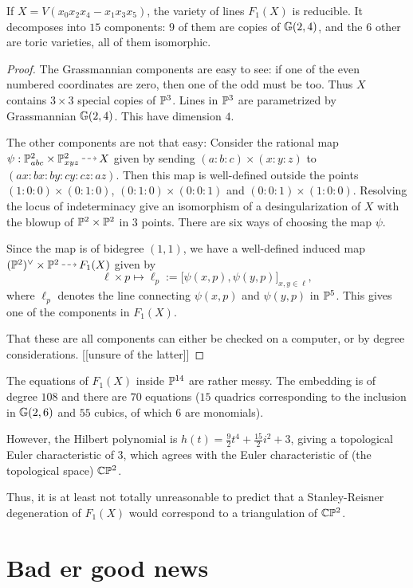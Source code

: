 \documentclass[11pt, english]{article}
\begin{document}
\begin{prop}
If $X=V(x_0x_2x_4-x_1x_3x_5)$, the variety of lines $F_1(X)$ is reducible. It decomposes into $15$ components: $9$ of them are copies of $\mathbb{G}(2,4)$, and the $6$ other are toric varieties, all of them isomorphic.
\end{prop}
\begin{proof}
The Grassmannian components are easy to see: if one of the even numbered coordinates are zero, then one of the odd must be too. Thus $X$ contains $3 \times 3$ special copies of $\mathbb{P}^3$. Lines in $\mathbb{P}^3$ are parametrized by Grassmannian $\mathbb{G}(2,4)$. This have dimension $4$. 

The other components are not that easy: Consider the  rational map $\psi:\PP^2_{abc} \times \PP^2_{xyz} \rmap X$ given by sending $(a:b:c) \times (x:y:z)$ to $(ax:bx:by:cy:cz:az)$. Then this map is well-defined outside the points $(1:0:0) \times (0:1:0)$, $(0:1:0)\times (0:0:1)$ and $(0:0:1)\times(1:0:0)$. Resolving the locus of indeterminacy give an isomorphism of a desingularization of $X$ with the blowup of $\mathbb{P}^2 \times \mathbb{P}^2$ in $3$ points. There are six ways of choosing the map $\psi$.

Since the map is of bidegree $(1,1)$, we have a well-defined induced map $(\PP^2)^\vee \times \PP^2 \rmap F_1(X)$ given by
\[
\ell \times p \mapsto \ell_p := \big[\psi(x,p),\psi(y,p)\big]_{x,y \in \ell},
\]
where $\ell_p$ denotes the line connecting $\psi(x,p)$ and $\psi(y,p)$ in $\mathbb{P}^5$. This gives one of the components in $F_1(X)$.


That these are all components can either be checked on a computer, or by degree considerations. [[unsure of the latter]]
\end{proof}

The equations of $F_1(X)$ inside $\mathbb{P}^{14}$ are rather messy. The embedding is of degree $108$ and there are $70$ equations ($15$ quadrics corresponding to the inclusion in $\mathbb{G}(2,6)$ and $55$ cubics, of which $6$ are monomials). 

However, the Hilbert polynomial is $h(t) =\frac 92 t^4 + \frac {15}2 i^2  + 3$, giving a topological Euler characteristic of $3$, which agrees with the Euler characteristic of (the topological space) $\mathbb{C} \mathbb{P}^2$.

Thus, it is at least not totally unreasonable to predict that a Stanley-Reisner degeneration of $F_1(X)$ would correspond to a triangulation of $ \mathbb{C} \mathbb{P} ^ 2$. 


\section{Bad er good news}
\end{document}
